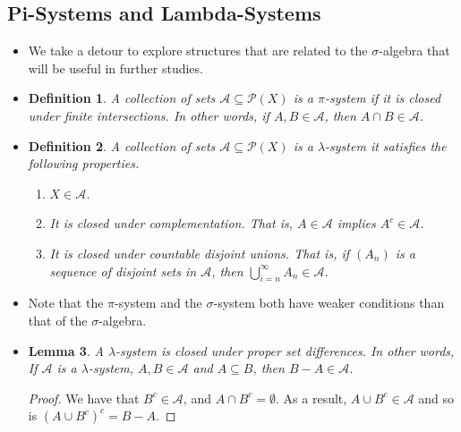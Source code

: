 \documentclass[10pt]{article}
\newtheorem{lemma}{Lemma}
\newtheorem{definition}[lemma]{Definition}
\newcommand{\mcal}[1]{\mathcal{#1}}
\begin{document}
\subsection{Pi-Systems and Lambda-Systems}

\begin{itemize}
  \item We take a detour to explore structures that are related to the $\sigma$-algebra that will be useful in further studies.
  
  \item \begin{definition}
    A collection of sets $\mcal{A} \subseteq \mcal{P}(X)$ is a $\pi$-system if it is closed under finite intersections. In other words, if $A, B \in \mcal{A}$, then $A \cap B \in \mcal{A}$.
  \end{definition}

  \item \begin{definition}
    A collection of sets $\mcal{A} \subseteq \mcal{P}(X)$ is a $\lambda$-system it satisfies the following properties.
    \begin{enumerate}
      \item $X \in \mcal{A}$.
      \item It is closed under complementation. That is, $A \in \mcal{A}$ implies $A^c \in \mcal{A}$.
      \item It is closed under countable disjoint unions. That is, if $(A_n)$ is a sequence of disjoint sets in $\mcal{A}$, then $\bigcup_{i=n}^\infty A_n \in \mcal{A}$.
    \end{enumerate}
  \end{definition}

  \item Note that the $\pi$-system and the $\sigma$-system both have weaker conditions than that of the $\sigma$-algebra.  
  
  \item \begin{lemma} \label{lemma:lambda-closure-under-proper-differences}
    A $\lambda$-system is closed under proper set differences. In other words, 
    If $\mcal{A}$ is a $\lambda$-system, $A, B \in \mcal{A}$ and $A \subseteq B$, then $B-A \in \mcal{A}$.
  \end{lemma}

  \begin{proof}
    We have that $B^c \in \mcal{A}$, and $A \cap B^c = \emptyset$. As a result, $A \cup B^c \in \mcal{A}$ and so is $(A \cup B^c)^c = B-A$.
  \end{proof}


\end{itemize}
\end{document}

